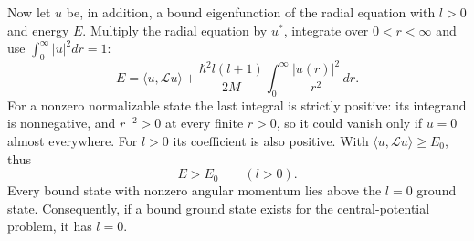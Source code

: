 Now let $u$ be, in addition, a bound eigenfunction of the radial
equation with $l>0$ and energy $E$. Multiply the radial equation by
$u^*$, integrate over $0<r<\infty$ and use $\int_0^\infty|u|^2dr=1$:
\[
 E=\langle u,\mathcal Lu\rangle
   +\frac{\hbar^2l(l+1)}{2M}
      \int_0^\infty\frac{|u(r)|^2}{r^2}\,dr.
\]
For a nonzero normalizable state the last integral is strictly
positive: its integrand is nonnegative, and $r^{-2}>0$ at every
finite $r>0$, so it could vanish only if $u=0$ almost everywhere.
For $l>0$ its coefficient is also positive.  With
$\langle u,\mathcal Lu\rangle\ge E_0$, thus
\[
 \boxed{E>E_0\qquad(l>0)}.
\]
Every bound state with nonzero angular momentum lies above the
$l=0$ ground state.  Consequently, if a bound ground state exists
for the central-potential problem, it has $l=0$.
